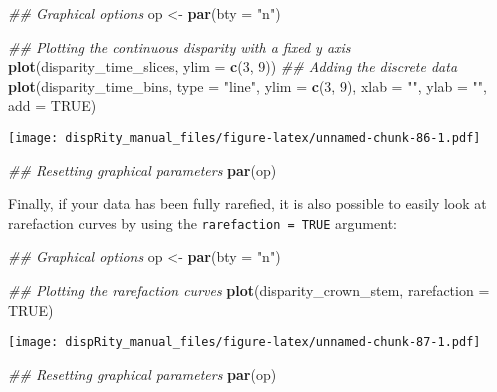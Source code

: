 \documentclass[
]{book}
\newenvironment{Shaded}{\begin{snugshade}}{\end{snugshade}}
\newcommand{\CommentTok}[1]{\textcolor[rgb]{0.56,0.35,0.01}{\textit{#1}}}
\newcommand{\DataTypeTok}[1]{\textcolor[rgb]{0.13,0.29,0.53}{#1}}
\newcommand{\DecValTok}[1]{\textcolor[rgb]{0.00,0.00,0.81}{#1}}
\newcommand{\KeywordTok}[1]{\textcolor[rgb]{0.13,0.29,0.53}{\textbf{#1}}}
\newcommand{\NormalTok}[1]{#1}
\newcommand{\OtherTok}[1]{\textcolor[rgb]{0.56,0.35,0.01}{#1}}
\newcommand{\StringTok}[1]{\textcolor[rgb]{0.31,0.60,0.02}{#1}}
\begin{document}
\begin{Shaded}
\begin{Highlighting}[]
\CommentTok{\#\# Graphical options}
\NormalTok{op \textless{}{-}}\StringTok{ }\KeywordTok{par}\NormalTok{(}\DataTypeTok{bty =} \StringTok{"n"}\NormalTok{)}

\CommentTok{\#\# Plotting the continuous disparity with a fixed y axis}
\KeywordTok{plot}\NormalTok{(disparity\_time\_slices, }\DataTypeTok{ylim =} \KeywordTok{c}\NormalTok{(}\DecValTok{3}\NormalTok{, }\DecValTok{9}\NormalTok{))}
\CommentTok{\#\# Adding the discrete data}
\KeywordTok{plot}\NormalTok{(disparity\_time\_bins, }\DataTypeTok{type =} \StringTok{"line"}\NormalTok{, }\DataTypeTok{ylim =} \KeywordTok{c}\NormalTok{(}\DecValTok{3}\NormalTok{, }\DecValTok{9}\NormalTok{),}
     \DataTypeTok{xlab =} \StringTok{""}\NormalTok{, }\DataTypeTok{ylab =} \StringTok{""}\NormalTok{, }\DataTypeTok{add =} \OtherTok{TRUE}\NormalTok{)}
\end{Highlighting}
\end{Shaded}

\texttt{[image: dispRity\_manual\_files/figure-latex/unnamed-chunk-86-1.pdf]}

\begin{Shaded}
\begin{Highlighting}[]
\CommentTok{\#\# Resetting graphical parameters}
\KeywordTok{par}\NormalTok{(op)}
\end{Highlighting}
\end{Shaded}

Finally, if your data has been fully rarefied, it is also possible to easily look at rarefaction curves by using the \texttt{rarefaction\ =\ TRUE} argument:

\begin{Shaded}
\begin{Highlighting}[]
\CommentTok{\#\# Graphical options}
\NormalTok{op \textless{}{-}}\StringTok{ }\KeywordTok{par}\NormalTok{(}\DataTypeTok{bty =} \StringTok{"n"}\NormalTok{)}

\CommentTok{\#\# Plotting the rarefaction curves}
\KeywordTok{plot}\NormalTok{(disparity\_crown\_stem, }\DataTypeTok{rarefaction =} \OtherTok{TRUE}\NormalTok{)}
\end{Highlighting}
\end{Shaded}

\texttt{[image: dispRity\_manual\_files/figure-latex/unnamed-chunk-87-1.pdf]}

\begin{Shaded}
\begin{Highlighting}[]
\CommentTok{\#\# Resetting graphical parameters}
\KeywordTok{par}\NormalTok{(op)}
\end{Highlighting}
\end{Shaded}
\end{document}
